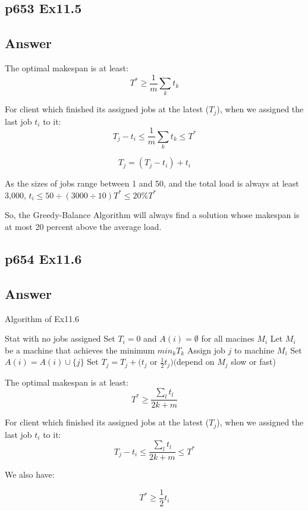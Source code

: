 \documentclass[a4paper]{article}
\begin{document}
\subsection*{p653 Ex11.5}
\subsection*{Answer}
The optimal makespan is at least:
$$
	T^{*} \geq \frac{1}{m} \sum_{k} t_{k}
$$

For client which finished its assigned jobs at the latest ($T_j$), when we assigned the last job $t_i$ to it:
$$
	T_{j}-t_{i} \leq \frac{1}{m} \sum_{k} t_{k} \leq T^{*}
$$

$$
	T_j = (T_{j}-t_{i}) + t_i
$$


As the sizes of jobs range between 1 and 50, and the total load is always at least 3,000, $t_i \leq 50 \div (3000 \div 10) T^{*} \leq 20\% T^{*}$

So, the Greedy-Balance Algorithm will always find a solution whose makespan is at most 20 percent above the average load.
\vspace{2cm}

\subsection*{p654 Ex11.6}
\subsection*{Answer}
\begin{algorithm}[!htb]
	\caption{Algorithm of Ex11.6}
	\begin{algorithmic}[1]
		\State Stat with no jobs assigned
		\State Set $T_i=0$ and $A(i)=\emptyset$ for all macines $M_i$
		\State Let $M_i$ be a machine that achieves the minimum $min_kT_k$
		\State Assign job $j$ to machine $M_i$
		\State Set $A(i) = A(i) \cup \{j\}$
		\State Set $T_j = T_j + (t_j$ or $\frac{1}{2}t_j) ($depend on $M_j$ slow or fast)
		\EndFor
	\end{algorithmic}
\end{algorithm}
The optimal makespan is at least:
$$
	T^{*} \geq \frac{\sum_{l} t_{l}}{2k+m}
$$

For client which finished its assigned jobs at the latest ($T_j$), when we assigned the last job $t_i$ to it:
$$
	T_{j}-t_{i} \leq \frac{\sum_{l} t_{l}}{2k+m} \leq T^{*}
$$

We also have:

$$
	T^* \geq \frac{1}{2} t_i
$$
\end{document}
